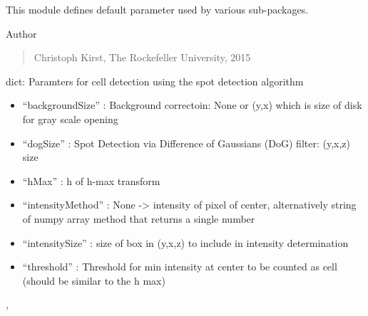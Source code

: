 \documentclass[letterpaper,10pt,english]{sphinxmanual}
\begin{document}
This module defines default parameter used by various sub-packages.




{\hyperref[api/ClearMap.Settings:module-ClearMap.Settings]{\emph{}}}



Author
\begin{quote}

Christoph Kirst, The Rockefeller University, 2015
\end{quote}

\begin{fulllineitems}
\label{api/ClearMap.Parameter:ClearMap.Parameter.SpotDetectionParameter}
dict: Paramters for cell detection using the spot detection algorithm
\begin{itemize}
\item {} 
``backgroundSize'' : Background correctoin: None or (y,x) which is size of disk for gray scale opening

\item {} 
``dogSize'' : Spot Detection via Difference of Gaussians (DoG) filter: (y,x,z) size

\item {} 
``hMax'' : h of h-max transform

\item {} 
``intensityMethod''  : None -\textgreater{} intensity of pixel of center, alternatively string of numpy array method that returns a single number

\item {} 
``intensitySize''    : size of box in (y,x,z) to include in intensity determination

\item {} 
``threshold'' : Threshold for min intensity at center to be counted as cell (should be similar to the h max)

\end{itemize}




{\hyperref[api/ClearMap.Parameter:ClearMap.Parameter.IlastikParameter]{\emph{}}}, {\hyperref[api/ClearMap.Parameter:ClearMap.Parameter.StackProcessingParameter]{\emph{}}}



\end{fulllineitems}
\end{document}
